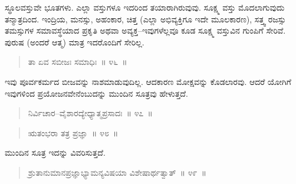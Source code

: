 
\vspace{0.2cm}

ಸ್ಥೂಲವಸ್ತುವೇ ಭೂತಗಳು. ಎಲ್ಲಾ ವಸ್ತುಗಳೂ ಇದರಿಂದ ತಯಾರಾಗಿರುವುವು. ಸೂಕ್ಷ್ಮ ವಸ್ತು ಮೊದಲಾಗುವುದು ತನ್ಮಾತ್ರದಿಂದ. ಇಂದ್ರಿಯ, ಮನಸ್ಸು, ಅಹಂಕಾರ, ಚಿತ್ತ (ಎಲ್ಲಾ ಅಭಿವ್ಯಕ್ತಿಗೂ ಇದೇ ಮೂಲಕಾರಣ), ಸತ್ತ್ವ ರಜಸ್ಸು ತಮಸ್ಸುಗಳ ಸಮಾವಸ್ಥೆಯಾದ ಪ್ರಕೃತಿ ಅಥವಾ ಅವ್ಯಕ್ತ–ಇವುಗಳೆಲ್ಲವೂ ಕೂಡ ಸೂಕ್ಷ್ಮ ವಸ್ತುವಿನ ಗುಂಪಿಗೆ ಸೇರಿವೆ. ಪುರುಷ (ಅಂದರೆ ಆತ್ಮ) ಮಾತ್ರ ಇದರೊಂದಿಗೆ ಸೇರಿಲ್ಲ.

\begin{verse}
ತಾ ಏವ ಸಬೀಜಃ ಸಮಾಧಿಃ~॥ ೪೬~॥
\end{verse}

\vspace{-0.4cm}


\newpage

ಇವು ಪೂರ್ವಕರ್ಮದ ಬೀಜವನ್ನು ನಾಶಮಾಡುವುದಿಲ್ಲ. ಆದಕಾರಣ ಮೋಕ್ಷವನ್ನು ಕೊಡಲಾರವು. ಆದರೆ ಯೋಗಿಗೆ ಇವುಗಳಿಂದ ಪ್ರಯೋಜನವೇನೆಂಬುದನ್ನು ಮುಂದಿನ ಸೂತ್ರವು ಹೇಳುತ್ತದೆ. 

\vspace{-0.2cm}

\begin{verse}
ನಿರ್ವಿಚಾರ–ವೈಶಾರದ್ಯೇಧ್ಯಾತ್ಮಪ್ರಸಾದಃ~॥ ೪೭~॥
\end{verse}

\vspace{-0.4cm}


\vspace{-0.1cm}

\begin{verse}
ಋತಂಭರಾ ತತ್ರ ಪ್ರಜ್ಞಾ~॥ ೪೮~॥
\end{verse}

\vspace{-0.4cm}


\vspace{0.2cm}

ಮುಂದಿನ ಸೂತ್ರ ಇದನ್ನು ವಿವರಿಸುತ್ತದೆ. 

\vspace{-0.2cm}

\begin{verse}
ಶ್ರುತಾನುಮಾನಪ್ರಜ್ಞಾಭ್ಯಾಮನ್ಯವಿಷಯಾ ವಿಶೇಷಾರ್ಥತ್ವಾತ್​~॥ ೪೯~॥
\end{verse}

\vspace{-0.4cm}

